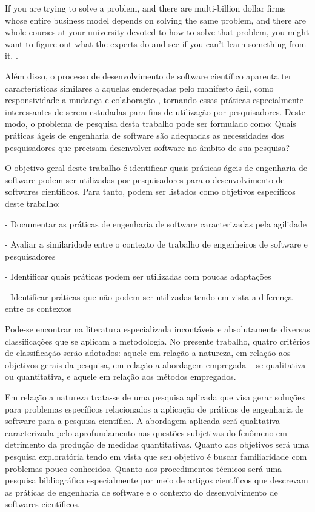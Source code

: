 \documentclass[
	article,			%
	11pt,				%
	oneside,			%
	a4paper,			%
	english,			%
	brazil,				%
	sumario=tradicional
	]{abntex2}
\begin{document}
\begin{citacao}
If you are trying to solve a problem, and there are multi-billion dollar firms whose entire business model depends on solving the same problem, and there are whole courses at your university devoted to how to solve that problem, you might want to figure out what the experts do and see if you can’t learn something from it. \cite[pg. 5]{gentzkow2014}.
\end{citacao}

Além disso, o processo de desenvolvimento de software científico aparenta ter características similares a aquelas endereçadas pelo manifesto ágil, como responsividade a mudança e colaboração \cite{sletholt2012}, tornando essas práticas especialmente interessantes de serem estudadas para fins de utilização por pesquisadores. Deste modo, o problema de pesquisa desta trabalho pode ser formulado como: Quais práticas ágeis de engenharia de software são adequadas as necessidades dos pesquisadores que precisam desenvolver software no âmbito de sua pesquisa?

O objetivo geral deste trabalho é identificar quais práticas ágeis de engenharia de software podem ser utilizadas por pesquisadores para o desenvolvimento de softwares científicos. Para tanto, podem ser listados como objetivos específicos deste trabalho:

- Documentar as práticas de engenharia de software caracterizadas pela agilidade

- Avaliar a similaridade entre o contexto de trabalho de engenheiros de software e pesquisadores

- Identificar quais práticas podem ser utilizadas com poucas adaptações

- Identificar práticas que não podem ser utilizadas tendo em vista a diferença entre os contextos

Pode-se encontrar na literatura especializada incontáveis e absolutamente diversas classificações que se aplicam a metodologia. No presente trabalho, quatro critérios de classificação serão adotados: aquele em relação a natureza, em relação aos objetivos gerais da pesquisa, em relação a abordagem empregada – se qualitativa ou quantitativa, e aquele em relação aos métodos empregados.

Em relação a natureza trata-se de uma pesquisa aplicada que visa gerar soluções para problemas específicos relacionados a aplicação de práticas de engenharia de software para a pesquisa científica. A abordagem aplicada será qualitativa caracterizada pelo aprofundamento nas questões subjetivas do fenômeno em detrimento da produção de medidas quantitativas. Quanto aos objetivos será uma pesquisa exploratória tendo em vista que seu objetivo é buscar familiaridade com problemas pouco conhecidos. Quanto aos procedimentos técnicos será uma pesquisa bibliográfica especialmente por meio de artigos científicos que descrevam as práticas de engenharia de software e o contexto do desenvolvimento de softwares científicos.
\end{document}
